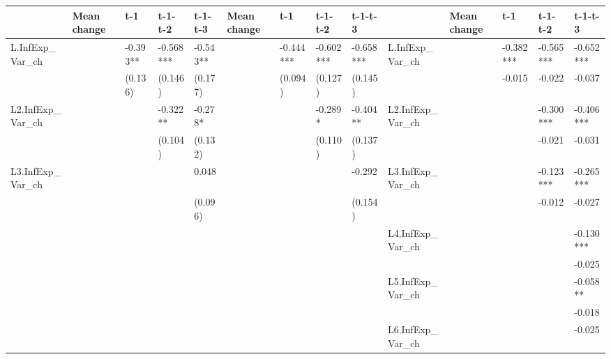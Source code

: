 \documentclass[]{article}
\begin{document}
\begin{table}
\begin{adjustbox}{width={24cm},totalheight={14cm}}
\begin{threeparttable}
\begin{tabular}{llllllllllllll}
					& Mean change & t-1       & t-1- t-2  & t-1-t-3   & Mean change   & t-1       & t-1- t-2  & t-1-t-3   &                      & Mean change   & t-1       & t-1- t-2  & t-1-t-3   \\
					\hline 
					L.InfExp\_Var\_ch    &             & -0.393**  & -0.568*** & -0.543**  &               & -0.444*** & -0.602*** & -0.658*** & L.InfExp\_Var\_ch    &               & -0.382*** & -0.565*** & -0.652*** \\
					&             & (0.136)   & (0.146)   & (0.177)   &               & (0.094)   & (0.127)   & (0.145)   &                      &               & -0.015    & -0.022    & -0.037    \\
					L2.InfExp\_Var\_ch   &             &           & -0.322**  & -0.278*   &               &           & -0.289*   & -0.404**  & L2.InfExp\_Var\_ch   &               &           & -0.300*** & -0.406*** \\
					&             &           & (0.104)   & (0.132)   &               &           & (0.110)   & (0.137)   &                      &               &           & -0.021    & -0.031    \\
					L3.InfExp\_Var\_ch   &             &           &           & 0.048     &               &           &           & -0.292    & L3.InfExp\_Var\_ch   &               &           & -0.123*** & -0.265*** \\
					&             &           &           & (0.096)   &               &           &           & (0.154)   &                      &               &           & -0.012    & -0.027    \\
					&             &           &           &           &               &           &           &           & L4.InfExp\_Var\_ch   &               &           &           & -0.130*** \\
					&             &           &           &           &               &           &           &           &                      &               &           &           & -0.025    \\
					&             &           &           &           &               &           &           &           & L5.InfExp\_Var\_ch   &               &           &           & -0.058**  \\
					&             &           &           &           &               &           &           &           &                      &               &           &           & -0.018    \\
					&             &           &           &           &               &           &           &           & L6.InfExp\_Var\_ch   &               &           &           & -0.025    \\

\end{tabular}
\end{threeparttable}
\end{adjustbox}
\end{table}
\end{document}

